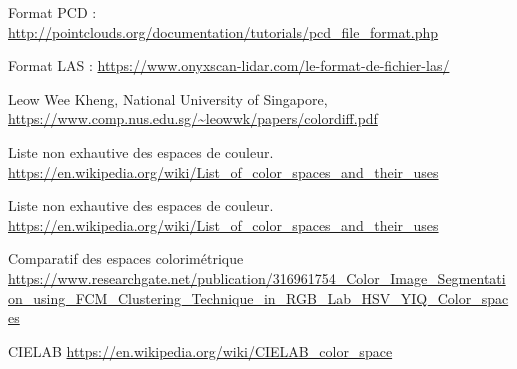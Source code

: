 \documentclass[12pt,titlepage,french]{article}
\newcounter{firstbib}
\begin{document}
\renewcommand{\refname}{Formats de fichier}
\begin{thebibliography}{3}
\setcounter{enumiv}{\value{firstbib}}

 Format PCD :
\url{http://pointclouds.org/documentation/tutorials/pcd_file_format.php}

 Format LAS :
\url{https://www.onyxscan-lidar.com/le-format-de-fichier-las/ }

\setcounter{firstbib}{\value{enumiv}}
\end{thebibliography}

\renewcommand{\refname}{Espaces colorimétriques}
\begin{thebibliography}{3}
\setcounter{enumiv}{\value{firstbib}}


 Leow Wee Kheng, National University of Singapore, 
\url{https://www.comp.nus.edu.sg/~leowwk/papers/colordiff.pdf}

 Liste non exhautive des espaces de couleur.
\url{https://en.wikipedia.org/wiki/List_of_color_spaces_and_their_uses}

 Liste non exhautive des espaces de couleur.
\url{https://en.wikipedia.org/wiki/List_of_color_spaces_and_their_uses}

 Comparatif des espaces colorimétrique
\url{https://www.researchgate.net/publication/316961754_Color_Image_Segmentation_using_FCM_Clustering_Technique_in_RGB_Lab_HSV_YIQ_Color_spaces}

CIELAB
\url{https://en.wikipedia.org/wiki/CIELAB_color_space}

\setcounter{firstbib}{\value{enumiv}}
\end{thebibliography}
\end{document}

